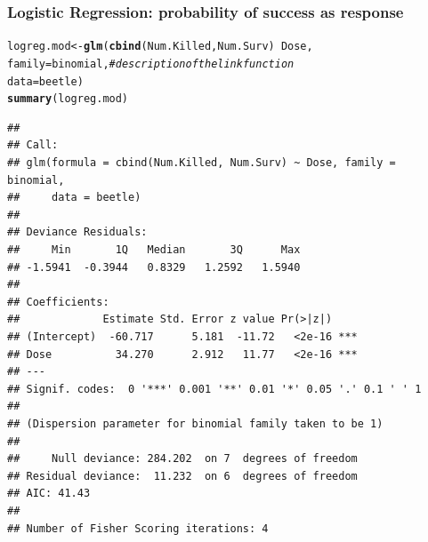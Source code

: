 \documentclass{beamer}\usepackage[]{graphicx}\usepackage[]{color}
\makeatletter
\newcommand{\hlcom}[1]{\textcolor[rgb]{0.678,0.584,0.686}{\textit{#1}}}%
\newcommand{\hlopt}[1]{\textcolor[rgb]{0,0,0}{#1}}%
\newcommand{\hlstd}[1]{\textcolor[rgb]{0.345,0.345,0.345}{#1}}%
\newcommand{\hlkwb}[1]{\textcolor[rgb]{0.69,0.353,0.396}{#1}}%
\newcommand{\hlkwc}[1]{\textcolor[rgb]{0.333,0.667,0.333}{#1}}%
\newcommand{\hlkwd}[1]{\textcolor[rgb]{0.737,0.353,0.396}{\textbf{#1}}}%
\newenvironment{kframe}{%
 \def\at@end@of@kframe{}%
 \ifinner\ifhmode%
  \def\at@end@of@kframe{\end{minipage}}%
  \begin{minipage}{\columnwidth}%
 \fi\fi%
 \def\FrameCommand##1{\hskip\@totalleftmargin \hskip-\fboxsep
 \colorbox{shadecolor}{##1}\hskip-\fboxsep
     \hskip-\linewidth \hskip-\@totalleftmargin \hskip\columnwidth}%
 \MakeFramed {\advance\hsize-\width
   \@totalleftmargin\z@ \linewidth\hsize
   \@setminipage}}%
 {\par\unskip\endMakeFramed%
 \at@end@of@kframe}
\newenvironment{knitrout}{}{} %
\makeatother
\begin{document}
{{{
\begin{frame}[fragile]
\frametitle{Logistic Regression: probability of success as response}
\begin{knitrout}\tiny
{}\color{fgcolor}\begin{kframe}
\begin{alltt}
\hlstd{logreg.mod} \hlkwb{<-} \hlkwd{glm}\hlstd{(}\hlkwd{cbind}\hlstd{(Num.Killed, Num.Surv)} \hlopt{~} \hlstd{Dose,}
               \hlkwc{family} \hlstd{= binomial,} \hlcom{# description of the link function}
               \hlkwc{data} \hlstd{= beetle)}
\hlkwd{summary}\hlstd{(logreg.mod)}
\end{alltt}
\begin{verbatim}
## 
## Call:
## glm(formula = cbind(Num.Killed, Num.Surv) ~ Dose, family = binomial, 
##     data = beetle)
## 
## Deviance Residuals: 
##     Min       1Q   Median       3Q      Max  
## -1.5941  -0.3944   0.8329   1.2592   1.5940  
## 
## Coefficients:
##             Estimate Std. Error z value Pr(>|z|)    
## (Intercept)  -60.717      5.181  -11.72   <2e-16 ***
## Dose          34.270      2.912   11.77   <2e-16 ***
## ---
## Signif. codes:  0 '***' 0.001 '**' 0.01 '*' 0.05 '.' 0.1 ' ' 1
## 
## (Dispersion parameter for binomial family taken to be 1)
## 
##     Null deviance: 284.202  on 7  degrees of freedom
## Residual deviance:  11.232  on 6  degrees of freedom
## AIC: 41.43
## 
## Number of Fisher Scoring iterations: 4
\end{verbatim}
\end{kframe}
\end{knitrout}
\end{frame}

}}}
\end{document}
